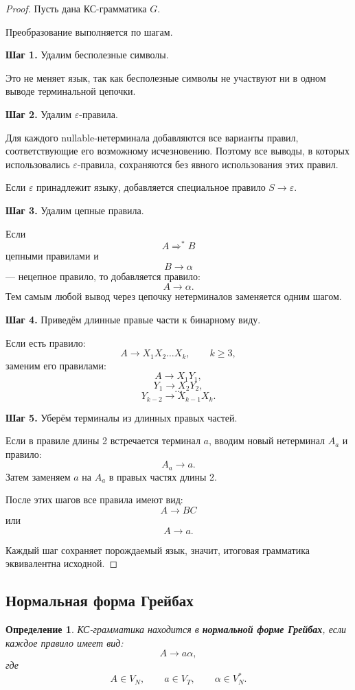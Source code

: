 \documentclass[12pt,a4paper]{article}
\newtheorem{definition}{Определение}
\newcommand{\eps}{\varepsilon}
\newcommand{\derivesstar}{\Rightarrow^{*}}
\begin{document}
\begin{proof}
Пусть дана КС-грамматика $G$.

Преобразование выполняется по шагам.

\textbf{Шаг 1.} Удалим бесполезные символы.

Это не меняет язык, так как бесполезные символы не участвуют ни в одном выводе терминальной цепочки.

\textbf{Шаг 2.} Удалим $\eps$-правила.

Для каждого nullable-нетерминала добавляются все варианты правил, соответствующие его возможному исчезновению. Поэтому все выводы, в которых использовались $\eps$-правила, сохраняются без явного использования этих правил.

Если $\eps$ принадлежит языку, добавляется специальное правило $S\to\eps$.

\textbf{Шаг 3.} Удалим цепные правила.

Если
\[
A\derivesstar B
\]
цепными правилами и
\[
B\to \alpha
\]
--- нецепное правило, то добавляется правило:
\[
A\to\alpha.
\]
Тем самым любой вывод через цепочку нетерминалов заменяется одним шагом.

\textbf{Шаг 4.} Приведём длинные правые части к бинарному виду.

Если есть правило:
\[
A\to X_1X_2\ldots X_k,\qquad k\ge 3,
\]
заменим его правилами:
\[
A\to X_1Y_1,
\]
\[
Y_1\to X_2Y_2,
\]
\[
\ldots
\]
\[
Y_{k-2}\to X_{k-1}X_k.
\]

\textbf{Шаг 5.} Уберём терминалы из длинных правых частей.

Если в правиле длины 2 встречается терминал $a$, вводим новый нетерминал $A_a$ и правило:
\[
A_a\to a.
\]
Затем заменяем $a$ на $A_a$ в правых частях длины 2.

После этих шагов все правила имеют вид:
\[
A\to BC
\]
или
\[
A\to a.
\]

Каждый шаг сохраняет порождаемый язык, значит, итоговая грамматика эквивалентна исходной.
\end{proof}

\subsection{Нормальная форма Грейбах}

\begin{definition}
КС-грамматика находится в \textbf{нормальной форме Грейбах}, если каждое правило имеет вид:
\[
A\to a\alpha,
\]
где
\[
A\in V_N,\qquad a\in V_T,\qquad \alpha\in V_N^*.
\]
\end{definition}
\end{document}

